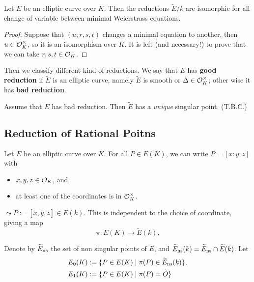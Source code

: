\begin{proposition}
    Let $E$ be an elliptic curve over $K$.
    Then the reductions $\tilde{E}/k$ are isomorphic for all change of variable between minimal Weierstrass equations.
\end{proposition}
\begin{proof}
    Suppose that $(u; r, s, t)$ changes a minimal equation to another, then $u\in\mathcal{O}_K^\times$, so it is an isomorphism over $K$.
    It is left (and necessary!) to prove that we can take $r, s, t\in \mathcal{O}_K$.
\end{proof}

Then we classify different kind of reductions.
We say that $E$ has \textbf{good reduction} if $\tilde{E}$ is an elliptic curve, namely $\tilde{E}$ is smooth or $\Delta\in\mathcal{O}_K^\times$; other wise it has \textbf{bad reduction}.

Assume that $E$ has bad reduction.
Then $\tilde{E}$ has a \textit{unique} singular point.
(T.B.C.)


\subsection{Reduction of Rational Poitns}
Let $E$ be an elliptic curve over $K$.
For all $P \in E(K)$,
we can write $P = [x : y : z]$ with \begin{itemize}
    \item $x, y, z\in\mathcal{O}_K$, and
    \item at least one of the coordinates is in $\mathcal{O}_K^\times$.
\end{itemize}
$\leadsto \tilde{P} := [\tilde{x}, \tilde{y}, \tilde{z}]\in \tilde{E}(k)$.
This is independent to the choice of coordinate,
giving a map \[\pi : E(K)\to\tilde{E}(k).\]

\begin{definition}
    Denote by $\widetilde{E}_{\mathrm{ns}}$ the set of non singular points of $\tilde{E}$, and $\widetilde{E}_{\mathrm{ns}}(k) = \widetilde{E}_{\mathrm{ns}}\cap\widetilde{E}(k)$.
    Let
    \begin{align*}
        E_0(K) &:= \{P\in E(K)\mid \pi(P)\in \widetilde{E}_{\mathrm{ns}}(k)\},\\ 
        E_1(K) &:= \{P\in E(K)\mid \pi(P) = \widetilde{O}\}
    \end{align*}
\end{definition}

